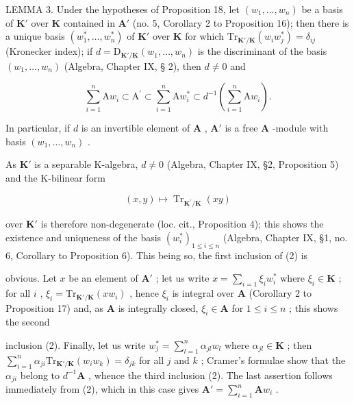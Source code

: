LEMMA 3. Under the hypotheses of Proposition 18, let \((w_{1},\ldots ,w_{n})\) be a basis of \(\mathbf{K}'\) over \(\mathbf{K}\) contained in \(\mathbf{A}'\) (no. 5, Corollary 2 to Proposition 16); then there is a unique basis \((w_{1}^{*},\dots ,w_{n}^{*})\) of \(\mathbf{K}'\) over \(\mathbf{K}\) for which \(\mathrm{Tr}_{\mathbf{K}' / \mathbf{K}}(w_i w_j^*) = \delta_{ij}\) (Kronecker index); if \(d = \mathrm{D}_{\mathbf{K}' / \mathbf{K}}(w_1,\dots ,w_n)\) is the discriminant of the basis \((w_{1},\dots ,w_{n})\) (Algebra, Chapter IX, § 2), then \(d\neq 0\) and

\[
\sum_ {i = 1} ^ {n} \mathrm{A} w _ {i} \subset \mathrm{A} ^ {\prime} \subset \sum_ {i = 1} ^ {n} \mathrm{A} w _ {i} ^ {*} \subset d ^ {- 1} \left(\sum_ {i = 1} ^ {n} \mathrm{A} w _ {i}\right).\tag{2}
\]

In particular, if \(d\) is an invertible element of \(\mathbf{A}\) , \(\mathbf{A}'\) is a free \(\mathbf{A}\) -module with basis \((w_1, \ldots, w_n)\) .

As \(\mathbf{K}'\) is a separable K-algebra, \(d \neq 0\) (Algebra, Chapter IX, §2, Proposition 5) and the K-bilinear form

\[
(x, y) \mapsto \operatorname{Tr} _ {\mathbf {K} ^ {\prime} / \mathbf {K}} (x y)
\]

over \(\mathbf{K}'\) is therefore non-degenerate (loc. cit., Proposition 4); this shows the existence and uniqueness of the basis \((w_{i}^{*})_{1\leqslant i\leqslant n}\) (Algebra, Chapter IX, §1, no. 6, Corollary to Proposition 6). This being so, the first inclusion of (2) is

obvious. Let \(x\) be an element of \(\mathbf{A}'\) ; let us write \(x = \sum_{i=1} \xi_i w_i^*\) where \(\xi_i \in \mathbf{K}\) ; for all \(i\) , \(\xi_i = \mathrm{Tr}_{\mathbf{K}' / \mathbf{K}}(xw_i)\) , hence \(\xi_i\) is integral over \(\mathbf{A}\) (Corollary 2 to Proposition 17) and, as \(\mathbf{A}\) is integrally closed, \(\xi_i \in \mathbf{A}\) for \(1 \leqslant i \leqslant n\) ; this shows the second

inclusion (2). Finally, let us write \(w_{j}^{*} = \sum_{l=1}^{n} \alpha_{jl} w_{l}\) where \(\alpha_{jl} \in \mathbf{K}\) ; then \(\sum_{i=1}^{n} \alpha_{ji} \mathrm{Tr}_{\mathbf{K}'/\mathbf{K}}(w_i w_k) = \delta_{jk}\) for all \(j\) and \(k\) ; Cramer's formulae show that the \(\alpha_{ji}\) belong to \(d^{-1}\mathbf{A}\) , whence the third inclusion (2). The last assertion follows immediately from (2), which in this case gives \(\mathbf{A}' = \sum_{i=1}^{n} \mathbf{A}w_i\) .

